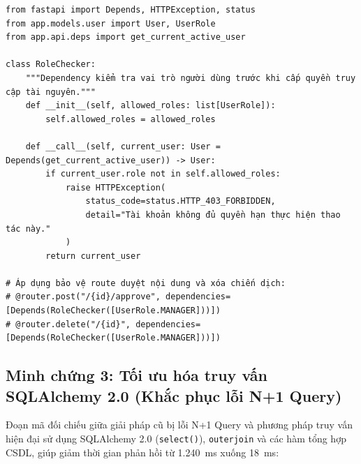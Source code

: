 \begin{footnotesize}
\begin{verbatim}
from fastapi import Depends, HTTPException, status
from app.models.user import User, UserRole
from app.api.deps import get_current_active_user

class RoleChecker:
    """Dependency kiểm tra vai trò người dùng trước khi cấp quyền truy cập tài nguyên."""
    def __init__(self, allowed_roles: list[UserRole]):
        self.allowed_roles = allowed_roles

    def __call__(self, current_user: User = Depends(get_current_active_user)) -> User:
        if current_user.role not in self.allowed_roles:
            raise HTTPException(
                status_code=status.HTTP_403_FORBIDDEN,
                detail="Tài khoản không đủ quyền hạn thực hiện thao tác này."
            )
        return current_user

# Áp dụng bảo vệ route duyệt nội dung và xóa chiến dịch:
# @router.post("/{id}/approve", dependencies=[Depends(RoleChecker([UserRole.MANAGER]))])
# @router.delete("/{id}", dependencies=[Depends(RoleChecker([UserRole.MANAGER]))])
\end{verbatim}
\end{footnotesize}

\subsection{Minh chứng 3: Tối ưu hóa truy vấn SQLAlchemy 2.0 (Khắc phục lỗi N+1 Query)}\label{subsec:v8-code-sqlalchemy-opt}

Đoạn mã đối chiếu giữa giải pháp cũ bị lỗi N+1 Query và phương pháp truy vấn hiện đại sử dụng SQLAlchemy 2.0 (\texttt{select()}), \texttt{outerjoin} và các hàm tổng hợp CSDL, giúp giảm thời gian phản hồi từ 1.240~ms xuống 18~ms:


